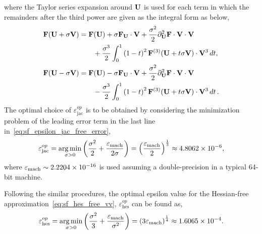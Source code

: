 where the Taylor series expansion around $\mathbf{U}$ is used for each term
in which the remainders after the third power are given
as the integral form as below,
\begin{equation}\label{eq:sf_epsilon_jac_free_taylor}
    \begin{split}
        \mathbf{F}(\mathbf{U} + \sigma \mathbf{V}) & = \mathbf{F}(\mathbf{U}) + \sigma \mathbf{F}_{\mathbf{U}} \cdot \mathbf{V} + \frac{\sigma^{2}}{2} \partial^{2}_{\mathbf{U}} \mathbf{F} \cdot \mathbf{V} \cdot \mathbf{V} \\
                              & \qquad + \frac{\sigma^{3}}{2} \int_{0}^{1} \left( 1 - t \right)^{2} \mathbf{F}^{(3)} (\mathbf{U} + t \sigma \mathbf{V}) \cdot \mathbf{V}^{3} \mathop{dt}, \\
        \mathbf{F}(\mathbf{U} - \sigma \mathbf{V}) & = \mathbf{F}(\mathbf{U}) - \sigma \mathbf{F}_{\mathbf{U}} \cdot \mathbf{V} + \frac{\sigma^{2}}{2} \partial^{2}_{\mathbf{U}} \mathbf{F} \cdot \mathbf{V} \cdot \mathbf{V} \\
                              & \qquad - \frac{\sigma^{3}}{2} \int_{0}^{1} \left( 1 - t \right)^{2} \mathbf{F}^{(3)} (\mathbf{U} + t \sigma \mathbf{V}) \cdot \mathbf{V}^{3} \mathop{dt}. \\
    \end{split}
\end{equation}
The optimal choice of \( \varepsilon_{\text{jac}}^{op} \) is to be obtained
by considering the minimization problem of the leading error term in the
last line in~\cref{eq:sf_epsilon_jac_free_error},
\begin{equation}\label{eq:sf_epsilon_jac_optimal}
    \varepsilon^{op}_{\text{jac}} = \operatorname*{arg\,min}_{\sigma > 0}
        \left( \frac{\sigma^{2}}{2} + \frac{\varepsilon_{\text{mach}}}{2 \sigma} \right) =
        {\left( \frac{\varepsilon_{\text{mach}}}{2} \right)}^{\frac{1}{3}} \approx \num{4.8062e-06},
\end{equation}
where \( \varepsilon_{\text{mach}} \sim \num{2.2204E-16} \) is used
assuming a double-precision in a typical 64-bit machine.

Following the similar procedures, the optimal epsilon value for
the Hessian-free approximation~\cref{eq:sf_hes_free_vv}, \( \varepsilon_{\text{hes}}^{op} \)
can be found as,
\begin{equation}\label{eq:sf_epsilon_hes_optimal}
    \varepsilon^{op}_{\text{hes}} = \operatorname*{arg\,min}_{\sigma > 0}
        \left( \frac{\sigma^{2}}{3} + \frac{\varepsilon_{\text{mach}}}{\sigma^{2}} \right) =
        {\left( 3 \varepsilon_{\text{mach}} \right)}^{\frac{1}{4}} \approx \num{1.6065e-04}.
\end{equation}

